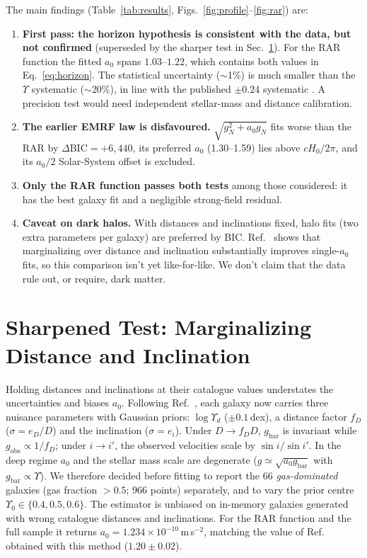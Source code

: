 \documentclass[11pt,a4paper]{article}
\begin{document}
The main findings (Table~\ref{tab:results}, Figs.~\ref{fig:profile}--\ref{fig:rar}) are:
\begin{enumerate}
\item \textbf{First pass: the horizon hypothesis is consistent with the data, but not confirmed} (superseded by the sharper test in Sec.~\ref{sec:marginalized}). For the RAR function the fitted $a_0$ spans $1.03$--$1.22$, which contains both values in Eq.~\eqref{eq:horizon}. The statistical uncertainty ($\sim$1\%) is much smaller than the $\Upsilon$ systematic ($\sim$20\%), in line with the published $\pm 0.24$ systematic \cite{mcgaugh2016rar}. A precision test would need independent stellar-mass and distance calibration.
\item \textbf{The earlier EMRF law is disfavoured.} $\sqrt{g_N^2 + a_0 g_N}$ fits worse than the RAR by $\Delta\mathrm{BIC} = +6{,}440$, its preferred $a_0$ (1.30--1.59) lies above $cH_0/2\pi$, and its $a_0/2$ Solar-System offset is excluded.
\item \textbf{Only the RAR function passes both tests} among those considered: it has the best galaxy fit and a negligible strong-field residual.
\item \textbf{Caveat on dark halos.} With distances and inclinations fixed, halo fits (two extra parameters per galaxy) are preferred by BIC. Ref.~\cite{li2018} shows that marginalizing over distance and inclination substantially improves single-$a_0$ fits, so this comparison isn't yet like-for-like. We don't claim that the data rule out, or require, dark matter.
\end{enumerate}

\section{Sharpened Test: Marginalizing Distance and Inclination}
\label{sec:marginalized}
Holding distances and inclinations at their catalogue values understates the uncertainties and biases $a_0$. Following Ref.~\cite{li2018}, each galaxy now carries three nuisance parameters with Gaussian priors: $\log\Upsilon_d$ ($\pm0.1$\,dex), a distance factor $f_D$ ($\sigma = e_D/D$) and the inclination ($\sigma = e_i$). Under $D \to f_D D$, $g_{\mathrm{bar}}$ is invariant while $g_{\mathrm{obs}} \propto 1/f_D$; under $i \to i'$, the observed velocities scale by $\sin i/\sin i'$. In the deep regime $a_0$ and the stellar mass scale are degenerate ($g \simeq \sqrt{a_0 g_{\mathrm{bar}}}$ with $g_{\mathrm{bar}} \propto \Upsilon$). We therefore decided before fitting to report the 66 \emph{gas-dominated} galaxies (gas fraction $> 0.5$; 966 points) separately, and to vary the prior centre $\Upsilon_0 \in \{0.4, 0.5, 0.6\}$. The estimator is unbiased on in-memory galaxies generated with wrong catalogue distances and inclinations. For the RAR function and the full sample it returns $a_0 = 1.234\times10^{-10}$\,m\,s$^{-2}$, matching the value of Ref.~\cite{li2018} obtained with this method ($1.20 \pm 0.02$).
\end{document}
